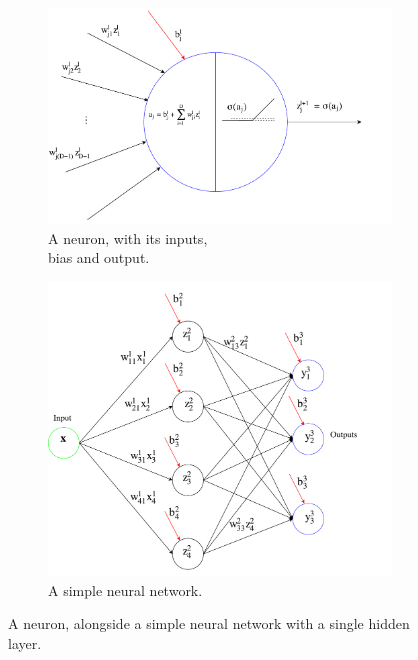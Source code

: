 \begin{figure}[H]
	\centering
	\begin{subfigure}[b]{.5\textwidth}
		\centering
		\includegraphics[width=\linewidth]{fig/neural.pdf}
		\caption{A neuron, with its inputs,\\ bias and output.}
		\label{fig:neuron}
	\end{subfigure}%
	\begin{subfigure}[b]{.5\textwidth}
		\centering
		\includegraphics[width=\linewidth]{fig/layers.pdf}
		\caption{A simple neural network.}
		\label{fig:layers}
	\end{subfigure}
	\caption{A neuron, alongside a simple neural network with a single hidden layer.}
	\label{fig:neural_net}
\end{figure}
